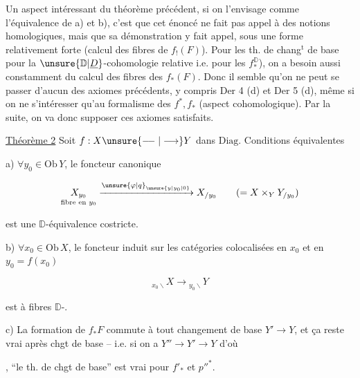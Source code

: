 Un aspect intéressant du théorème précédent, si on l'envisage comme  l'équivalence de a) et b), c'est que cet énoncé ne fait pas appel à des notions homologiques, mais que sa démonstration y fait appel, sous une forme relativement forte (calcul des fibres de $f_!(F)$). Pour les th. de chang$^{\mathrm t}$ de base pour la $\unsure{\mathbb D|\underline D}$-cohomologie relative i.e. pour les $f_*^{\mathbb D}$), on a besoin aussi constamment du calcul des fibres des $f_*(F)$. Donc il semble qu'on ne peut se passer d'aucun des axiomes précédents, y compris Der 4 (d) et Der 5 (d), même si on ne  s'intéresser qu'au formalisme des $f^*,f_*$ (aspect cohomologique). Par la suite, on va donc supposer ces axiomes satisfaits.

\uline{Théorème 2} Soit $f:X\unsure{\relbar\joinrel\relbar|\longrightarrow}Y$ dans $\mathrm{Diag}$. Conditions équivalentes

a) $\forall y_0\in\mathrm{Ob}\,Y$, le foncteur canonique 

\[ \underset{\text{fibre en }y_0}{X_{y_0}}\xrightarrow{\unsure{\varphi|q}_{\unsure{y|y_0|0}}}X_{/y_0}\qquad (=X\times_Y Y_{/y_0}) \]

est une $\mathbb D$-équivalence costricte.

b) $\forall x_0\in\mathrm{Ob}\,X$, le foncteur induit sur les catégories colocalisées en $x_0$ et en $y_0=f(x_0)$

\[ {}_{x_0\backslash}X\longrightarrow{}_{y_0\backslash}Y \]

est à fibres $\mathbb D$-.

c) La formation de $f_*F$  commute à tout changement de base $Y'\longrightarrow Y$, et ça reste vrai  après  chgt de base -- i.e. si on a $Y''\longrightarrow Y'\longrightarrow Y$ d'où


, ``le th. de chgt de base'' est vrai pour $f'_*$ et $p''^*$.

